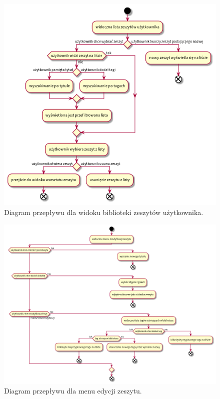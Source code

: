 \begin{figure}[H]
	\begin{center}
		\includegraphics[scale=0.42]{media/UserFlowLibrary.png}
	\end{center}
	\caption{Diagram przepływu dla widoku biblioteki zeszytów użytkownika.}
	\label{rys:flow-library}
\end{figure}
\begin{figure}[H]
	\begin{center}
		\includegraphics[scale=0.4]{media/UserFlowBook.png}
	\end{center}
	\caption{Diagram przepływu dla menu edycji zeszytu.}
	\label{rys:flow-book-menu}
\end{figure}
